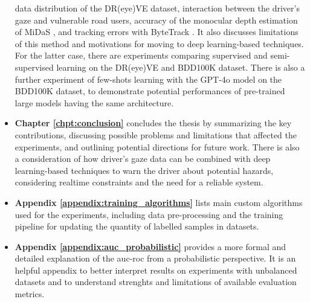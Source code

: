 \begin{itemize}
    data distribution of the DR(eye)VE dataset, interaction between the 
    driver's gaze and vulnerable road users, accuracy of the monocular depth 
    estimation of MiDaS \cite{midas}, and tracking errors with ByteTrack \cite{bytetrack}. 
    It also discusses limitations of this method 
    and motivations for moving to deep learning-based techniques.
    For the latter case, there are experiments comparing supervised and 
    semi-supervised learning on the DR(eye)VE and BDD100K dataset. There is also 
    a further experiment of few-shots learning with the GPT-4o model on the 
    BDD100K dataset, to demonstrate potential performances of pre-trained large 
    models having the same architecture.

    \item \textbf{Chapter \ref{chpt:conclusion}} concludes the thesis by summarizing 
    the key contributions, discussing possible problems and limitations that 
    affected the experiments, and outlining potential directions for future work.
    There is also a consideration of how driver's gaze data can be combined with 
    deep learning-based techniques to warn the driver about potential hazards, 
    considering realtime constraints and the need for a reliable system.
    \item \textbf{Appendix \ref{appendix:training_algorithms}} lists main custom 
    algorithms used for the experiments, including data pre-processing and the 
    training pipeline for updating the quantity of labelled samples in datasets.
    \item \textbf{Appendix \ref{appendix:auc_probabilistic}} provides a more 
    formal and detailed explanation of the \acs{auc}-\acs{roc} from a probabilistic
    perspective. It is an helpful appendix to better interpret results on 
    experiments with unbalanced datasets and to understand strenghts and 
    limitations of available evaluation metrics.
\end{itemize}
